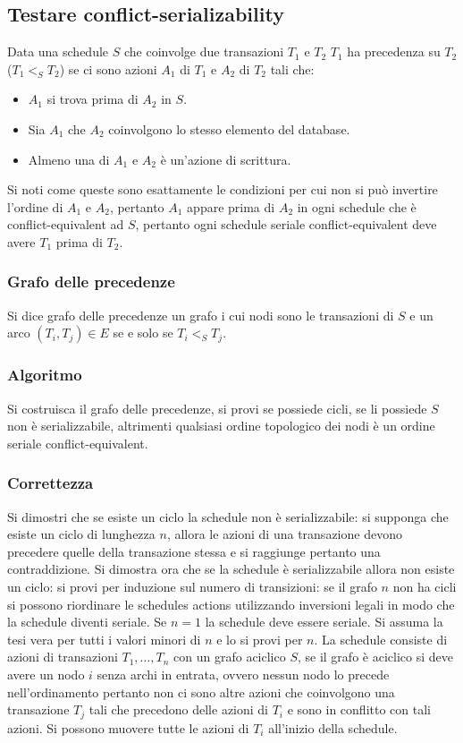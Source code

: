 \subsection{Testare conflict-serializability}
Data una schedule $S$ che coinvolge due transazioni $T_1$ e $T_2$ $T_1$ ha precedenza su $T_2$ ($T_1<_S T_2$) se ci sono azioni $A_1$ di $T_1$ e $A_2$ di $T_2$ tali che:
\begin{itemize}
\item $A_1$ si trova prima di $A_2$ in $S$.
\item Sia $A_1$ che $A_2$ coinvolgono lo stesso elemento del database.
\item Almeno una di $A_1$ e $A_2$ \`e un'azione di scrittura.
\end{itemize}
Si noti come queste sono esattamente le condizioni per cui non si pu\`o invertire l'ordine di $A_1$ e $A_2$, pertanto $A_1$ appare prima di $A_2$ in ogni schedule che \`e conflict-equivalent ad $S$, pertanto 
ogni schedule seriale conflict-equivalent deve avere $T_1$ prima di $T_2$. 
\subsubsection{Grafo delle precedenze}
Si dice grafo delle precedenze un grafo i cui nodi sono le transazioni di $S$ e un arco $(T_i, T_j)\in E$ se e solo se $T_i<_S T_j$. 
\subsubsection{Algoritmo}
Si costruisca il grafo delle precedenze, si provi se possiede cicli, se li possiede $S$ non \`e serializzabile, altrimenti qualsiasi ordine topologico dei nodi \`e un ordine seriale conflict-equivalent.
\subsubsection{Correttezza}
Si dimostri che se esiste un ciclo la schedule non \`e serializzabile: si supponga che esiste un ciclo di lunghezza $n$, allora le azioni di una transazione devono precedere quelle della transazione stessa e si
raggiunge pertanto una contraddizione. Si dimostra ora che se la schedule \`e serializzabile allora non esiste un ciclo: si provi per induzione sul numero di transizioni: se il grafo $n$ non ha cicli si possono 
riordinare le schedules actions utilizzando inversioni legali in modo che la schedule diventi seriale. Se $n=1$ la schedule deve essere seriale. Si assuma la tesi vera per tutti i valori minori di $n$ e lo si provi per 
$n$. La schedule consiste di azioni di transazioni $T_1, \dots, T_n$ con un grafo aciclico $S$, se il grafo \`e aciclico si deve avere un nodo $i$ senza archi in entrata, ovvero nessun nodo lo precede 
nell'ordinamento pertanto non ci sono altre azioni che coinvolgono una transazione $T_j$ tali che precedono delle azioni di $T_i$ e sono in conflitto con tali azioni. Si possono muovere tutte le azioni di $T_i$ 
all'inizio della schedule. 
